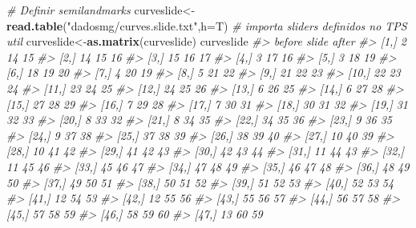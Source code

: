 \documentclass[
]{book}
\newenvironment{Shaded}{\begin{snugshade}}{\end{snugshade}}
\newcommand{\AttributeTok}[1]{\textcolor[rgb]{0.13,0.29,0.53}{#1}}
\newcommand{\CommentTok}[1]{\textcolor[rgb]{0.56,0.35,0.01}{\textit{#1}}}
\newcommand{\FunctionTok}[1]{\textcolor[rgb]{0.13,0.29,0.53}{\textbf{#1}}}
\newcommand{\NormalTok}[1]{#1}
\newcommand{\OtherTok}[1]{\textcolor[rgb]{0.56,0.35,0.01}{#1}}
\newcommand{\StringTok}[1]{\textcolor[rgb]{0.31,0.60,0.02}{#1}}
\begin{document}
\begin{Shaded}
\begin{Highlighting}[]
\CommentTok{\# Definir semilandmarks}
\NormalTok{curveslide}\OtherTok{\textless{}{-}}\FunctionTok{read.table}\NormalTok{(}\StringTok{"dadosmg/curves.slide.txt"}\NormalTok{,}\AttributeTok{h=}\NormalTok{T) }\CommentTok{\# importa sliders definidos no TPS util }
\NormalTok{curveslide}\OtherTok{\textless{}{-}}\FunctionTok{as.matrix}\NormalTok{(curveslide) }
\NormalTok{curveslide}
\CommentTok{\#\textgreater{}       before slide after}
\CommentTok{\#\textgreater{}  [1,]      2    14    15}
\CommentTok{\#\textgreater{}  [2,]     14    15    16}
\CommentTok{\#\textgreater{}  [3,]     15    16    17}
\CommentTok{\#\textgreater{}  [4,]      3    17    16}
\CommentTok{\#\textgreater{}  [5,]      3    18    19}
\CommentTok{\#\textgreater{}  [6,]     18    19    20}
\CommentTok{\#\textgreater{}  [7,]      4    20    19}
\CommentTok{\#\textgreater{}  [8,]      5    21    22}
\CommentTok{\#\textgreater{}  [9,]     21    22    23}
\CommentTok{\#\textgreater{} [10,]     22    23    24}
\CommentTok{\#\textgreater{} [11,]     23    24    25}
\CommentTok{\#\textgreater{} [12,]     24    25    26}
\CommentTok{\#\textgreater{} [13,]      6    26    25}
\CommentTok{\#\textgreater{} [14,]      6    27    28}
\CommentTok{\#\textgreater{} [15,]     27    28    29}
\CommentTok{\#\textgreater{} [16,]      7    29    28}
\CommentTok{\#\textgreater{} [17,]      7    30    31}
\CommentTok{\#\textgreater{} [18,]     30    31    32}
\CommentTok{\#\textgreater{} [19,]     31    32    33}
\CommentTok{\#\textgreater{} [20,]      8    33    32}
\CommentTok{\#\textgreater{} [21,]      8    34    35}
\CommentTok{\#\textgreater{} [22,]     34    35    36}
\CommentTok{\#\textgreater{} [23,]      9    36    35}
\CommentTok{\#\textgreater{} [24,]      9    37    38}
\CommentTok{\#\textgreater{} [25,]     37    38    39}
\CommentTok{\#\textgreater{} [26,]     38    39    40}
\CommentTok{\#\textgreater{} [27,]     10    40    39}
\CommentTok{\#\textgreater{} [28,]     10    41    42}
\CommentTok{\#\textgreater{} [29,]     41    42    43}
\CommentTok{\#\textgreater{} [30,]     42    43    44}
\CommentTok{\#\textgreater{} [31,]     11    44    43}
\CommentTok{\#\textgreater{} [32,]     11    45    46}
\CommentTok{\#\textgreater{} [33,]     45    46    47}
\CommentTok{\#\textgreater{} [34,]     47    48    49}
\CommentTok{\#\textgreater{} [35,]     46    47    48}
\CommentTok{\#\textgreater{} [36,]     48    49    50}
\CommentTok{\#\textgreater{} [37,]     49    50    51}
\CommentTok{\#\textgreater{} [38,]     50    51    52}
\CommentTok{\#\textgreater{} [39,]     51    52    53}
\CommentTok{\#\textgreater{} [40,]     52    53    54}
\CommentTok{\#\textgreater{} [41,]     12    54    53}
\CommentTok{\#\textgreater{} [42,]     12    55    56}
\CommentTok{\#\textgreater{} [43,]     55    56    57}
\CommentTok{\#\textgreater{} [44,]     56    57    58}
\CommentTok{\#\textgreater{} [45,]     57    58    59}
\CommentTok{\#\textgreater{} [46,]     58    59    60}
\CommentTok{\#\textgreater{} [47,]     13    60    59}
\end{Highlighting}
\end{Shaded}
\end{document}
